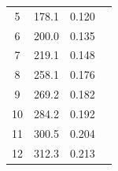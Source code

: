\documentclass[a4paper,12pt]{article}
\begin{document}
\begin{table}[H]
\begin{subtable}[t]{0.45\textwidth}
\begin{tabular}{|c|c|c|c|}
			5                                                          & 178.1                                                                            & 0.120                                                                        &                                                                \\ \cline{1-3}
			6                                                          & 200.0                                                                            & 0.135                                                                        &                                                                \\ \cline{1-3}
			7                                                          & 219.1                                                                            & 0.148                                                                        &                                                                \\ \cline{1-3}
			8                                                          & 258.1                                                                            & 0.176                                                                        &                                                                \\ \cline{1-3}
			9                                                          & 269.2                                                                            & 0.182                                                                        &                                                                \\ \cline{1-3}
			10                                                         & 284.2                                                                            & 0.192                                                                        &                                                                \\ \cline{1-3}
			11                                                         & 300.5                                                                            & 0.204                                                                        &                                                                \\ \cline{1-3}
			12                                                         & 312.3                                                                            & 0.213                                                                        &                                                                \\ \cline{1-3}

\end{tabular}
\end{subtable}
\end{table}
\end{document}
